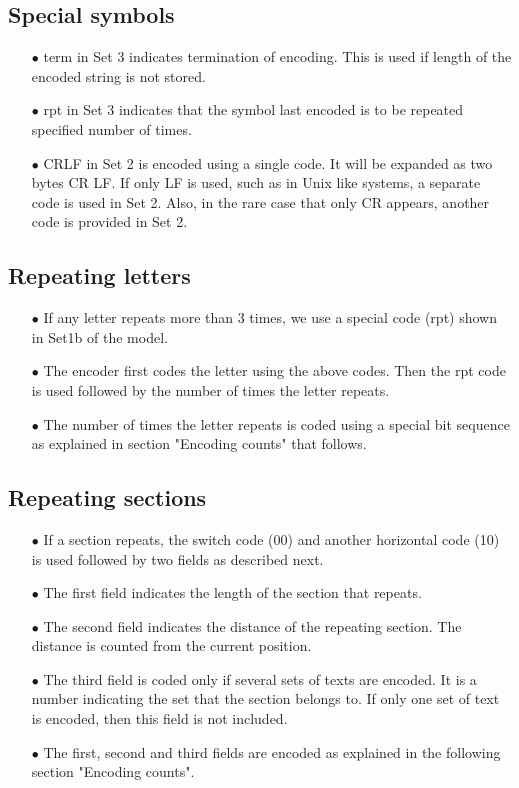 \documentclass[]{article}
\begin{document}
\subsection{Special symbols}
\begin{itemize}
	\item[$\bullet$] term in Set 3 indicates termination of encoding.  This is used if length of the encoded string is not stored.
	\item[$\bullet$] rpt in Set 3 indicates that the symbol last encoded is to be repeated specified number of times.
	\item[$\bullet$] CRLF in Set 2 is encoded using a single code. It will be expanded as two bytes CR LF.  If only LF is used, such as in Unix like systems, a separate code is used in Set 2.  Also, in the rare case that only CR appears, another code is provided in Set 2.
\end{itemize}

\subsection{Repeating letters}
\begin{itemize}
	\item[$\bullet$] If any letter repeats more than 3 times, we use a special code (rpt) shown in Set1b of the model.
	\item[$\bullet$] The encoder first codes the letter using the above codes.  Then the rpt code is used followed by the number of times the letter repeats.
	\item[$\bullet$] The number of times the letter repeats is coded using a special bit sequence as explained in section "Encoding counts" that follows.
\end{itemize}

\subsection{Repeating sections}
\begin{itemize}
	\item[$\bullet$] If a section repeats, the switch code (00) and another horizontal code (10) is used followed by two fields as described next.
  	\item[$\bullet$] The first field indicates the length of the section that repeats.
	\item[$\bullet$] The second field indicates the distance of the repeating section.  The distance is counted from the current position.
	\item[$\bullet$] The third field is coded only if several sets of texts are encoded.  It is a number indicating the set that the section belongs to.  If only one set of text is encoded, then this field is not included. 
	\item[$\bullet$] The first, second and third fields are encoded as explained in the following section "Encoding counts".
\end{itemize}
\end{document}
